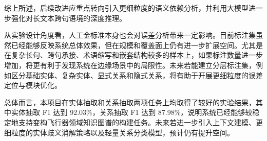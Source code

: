 综上所述，后续改进应重点转向引入更细粒度的语义依赖分析，并利用大模型进一步强化对长文本跨句语境的深度推理。

从实验设计角度看，人工金标准本身也会对误差分析带来一定影响。目前标注集虽然已经能够反映系统总体效果，但在规模和覆盖面上仍有进一步扩展空间。尤其是在复杂长句、跨句承接、术语缩写和嵌套结构较多的样本上，如果标注数量进一步增加，将更有利于发现系统在边缘场景中的局限性。未来若能建立分层标注集，例如区分基础实体、复杂实体、显式关系和隐式关系，将有助于开展更细粒度的误差定位与模块优化。

总体而言，本项目在实体抽取和关系抽取两项任务上均取得了较好的实验结果，其中实体抽取 F1 达到 92.03\%，关系抽取 F1 达到 87.98\%，说明系统已经能够较稳定地支持变构飞行器领域知识图谱的构建任务。未来若进一步引入上下文建模、更细粒度的实体歧义消解策略以及轻量关系分类模型，预计仍有提升空间。
